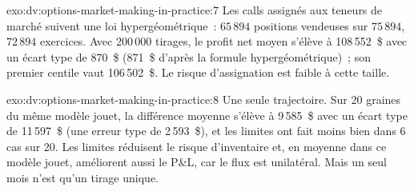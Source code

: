\begin{solution}{exo:dv:options-market-making-in-practice:7}
Les calls assignés aux teneurs de marché suivent une loi hypergéométrique~: $65\,894$ positions vendeuses sur $75\,894$, $72\,894$ exercices. Avec 200\,000 tirages, le profit net moyen
s'élève à 108\,552~\$ avec un écart type de 870~\$ (871~\$ d'après la formule hypergéométrique)~; son premier centile vaut 106\,502~\$. Le risque d'assignation est faible à cette taille.
\end{solution}

\begin{solution}{exo:dv:options-market-making-in-practice:8}
Une seule trajectoire. Sur 20 graines du même modèle jouet, la différence moyenne s'élève à 9\,585~\$ avec un écart type de 11\,597~\$ (une erreur type de 2\,593~\$), et les limites ont fait moins bien
dans 6 cas sur 20. Les limites réduisent le risque d'inventaire et, en moyenne dans ce modèle jouet, améliorent aussi le P\&L, car le flux est unilatéral. Mais un seul mois
n'est qu'un tirage unique.
\end{solution}

